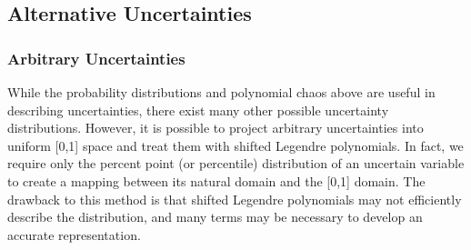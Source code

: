 \subsection{Alternative Uncertainties}


\subsubsection{Arbitrary Uncertainties}
While the probability distributions and polynomial chaos above are useful in describing uncertainties, there exist many other possible uncertainty distributions.  However, it is possible to project arbitrary uncertainties into uniform [0,1] space and treat them with shifted Legendre polynomials.  In fact, we require only the percent point (or percentile) distribution of an uncertain variable to create a mapping between its natural domain and the [0,1] domain.  The drawback to this method is that shifted Legendre polynomials may not efficiently describe the distribution, and many terms may be necessary to develop an accurate representation.

